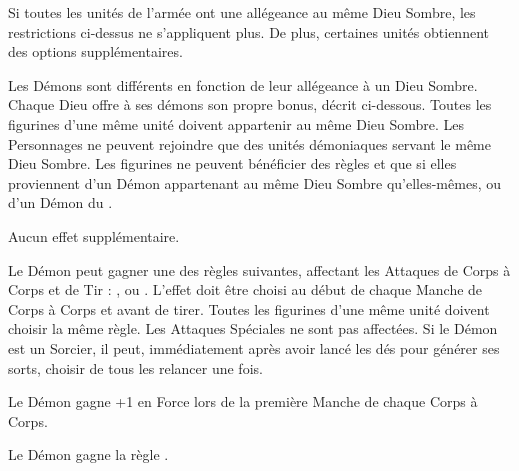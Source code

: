\armyspecialruleentry{\monotheistarmybonus}

Si toutes les unités de l'armée ont une allégeance au même Dieu Sombre, les restrictions ci-dessus ne s'appliquent plus. De plus, certaines unités obtiennent des options supplémentaires.

\closearmywiderules









\newpage
\startarmyspecialrules

\armyspecialruleentry{\daemonofthedarkgods}

Les Démons sont différents en fonction de leur allégeance à un Dieu Sombre. Chaque Dieu offre à ses démons son propre bonus, décrit ci-dessous. Toutes les figurines d'une même unité doivent appartenir au même Dieu Sombre. Les Personnages ne peuvent rejoindre que des unités démoniaques servant le même Dieu Sombre. Les figurines ne peuvent bénéficier des règles \holdyourground{} et \inspiringpresence{} que si elles proviennent d'un Démon appartenant au même Dieu Sombre qu'elles-mêmes, ou d'un Démon du \truechaos{}.

\spacebetweenalliance{}

\hfill{}
Aucun effet supplémentaire.
\allianceclosesidetext{}

\spacebetweenalliance{}

Le Démon peut gagner une des règles suivantes, affectant les Attaques de Corps à Corps et de Tir : \divineattacks{}, \flamingattacks{} ou \hellfire{}. L'effet doit être choisi au début de chaque Manche de Corps à Corps et avant de tirer. Toutes les figurines d'une même unité doivent choisir la même règle. Les Attaques Spéciales ne sont pas affectées. Si le Démon est un Sorcier, il peut, immédiatement après avoir lancé les dés pour générer ses sorts, choisir de tous les relancer une fois.
\allianceclosesidetext{}\hfill
{}

\spacebetweenalliance{}

\hfill{}
Le Démon gagne +1 en Force lors de la première Manche de chaque Corps à Corps.
\allianceclosesidetext{}

\spacebetweenalliance{}

Le Démon gagne la règle .
\allianceclosesidetext{}\hfill
{}

